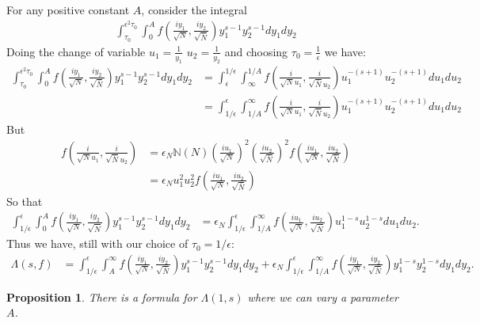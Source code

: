 \documentclass{article}
\theoremstyle{plain}
\newtheorem{proposition}{Proposition}
\begin{document}
For any positive constant $A$, consider the integral  
\begin{align*}
\int_{\tau_0}^{\epsilon^2 \tau_0}\int_{0}^{A} f\left(\frac{iy_1}{\sqrt{N}},\frac{iy_2}{\sqrt{\bar{N}}}\right) y_1^{s-1}y_2^{s-1} dy_1 dy_2 
\end{align*}
Doing the change of variable $u_1=\frac{1}{y_1}$ $u_2=\frac{1}{y_2}$ and choosing $\tau_0=\frac{1}{\epsilon}$ we have:
\begin{align*}
\int_{\tau_0}^{\epsilon^2 \tau_0}\int_{0}^{A} f\left(\frac{iy_1}{\sqrt{N}},\frac{iy_2}{\sqrt{\bar{N}}}\right) y_1^{s-1}y_2^{s-1} dy_1 dy_2 
&= \int_{\epsilon}^{1/\epsilon}\int_{\infty}^{1/A} f\left(\frac{i}{\sqrt{N}u_1},\frac{i}{\sqrt{\bar{N}}u_2}\right) u_1^{-(s+1)} u_2^{-(s+1)} du_1 du_2\\
&=  \int_{1/\epsilon}^{\epsilon}\int^{\infty}_{1/A} f\left(\frac{i}{\sqrt{N}u_1},\frac{i}{\sqrt{\bar{N}}u_2}\right) u_1^{-(s+1)} u_2^{-(s+1)} du_1 du_2
\end{align*}
But 
\begin{align*}
f\left(\frac{i}{\sqrt{N}u_1},\frac{i}{\sqrt{\bar{N}}u_2}\right)&= \epsilon_N \mathbb{N}(N)\left(\frac{iu_1}{\sqrt{N}}\right)^2\left(\frac{iu_2}{\sqrt{\bar{N}}}\right)^2 f\left(\frac{iu_1}{\sqrt{N}},\frac{iu_2}{\sqrt{\bar{N}}}\right)\\
&= \epsilon_N u_1^2 u_2^2 f\left(\frac{iu_1}{\sqrt{N}},\frac{iu_2}{\sqrt{\bar{N}}}\right)
\end{align*}
So that
\begin{align*}
\int_{1/\epsilon}^{\epsilon}\int_{0}^{A} f\left(\frac{iy_1}{\sqrt{N}},\frac{iy_2}{\sqrt{\bar{N}}}\right) y_1^{s-1}y_2^{s-1}   dy_1 dy_2&=
\epsilon_N \int_{1/\epsilon}^{\epsilon} \int_{1/A}^{\infty} f\left(\frac{iu_1}{\sqrt{N}},\frac{iu_2}{\sqrt{\bar{N}}}\right) u_1^{1-s}u_2^{1-s}du_1 du_2.
\end{align*}
Thus we have, still with our choice of $\tau_0=1/\epsilon$:
\begin{align}\label{niceformula}
\Lambda(s,f)&= \int_{1/\epsilon}^{\epsilon}\int_{A}^{\infty} f\left(\frac{iy_1}{\sqrt{N}},\frac{iy_2}{\sqrt{\bar{N}}}\right) y_1^{s-1}y_2^{s-1} dy_1 dy_2 + \epsilon_N \int_{1/\epsilon}^{\epsilon} \int_{1/A}^{\infty} f\left(\frac{iy_1}{\sqrt{N}},\frac{iy_2}{\sqrt{\bar{N}}}\right) y_1^{1-s}y_2^{1-s} dy_1 dy_2.
\end{align}

\begin{proposition}
There is a formula for $\Lambda(1,s)$ where we can vary a parameter $A$.
\end{proposition}
\end{document}
